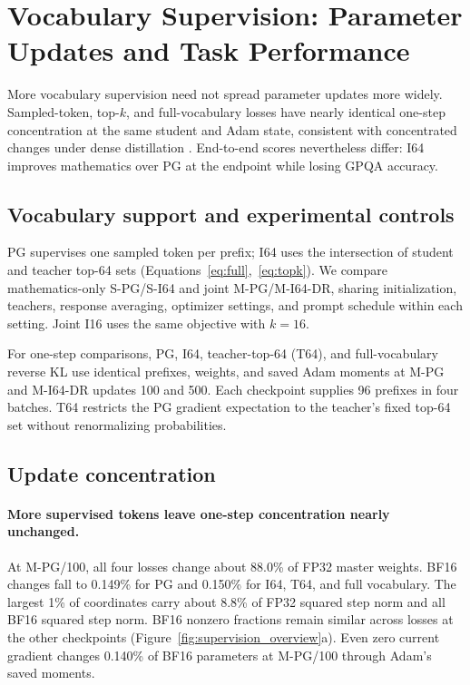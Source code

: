 \section{Vocabulary Supervision: Parameter Updates and Task Performance}
\label{sec:density}

More vocabulary supervision need not spread parameter updates more widely. Sampled-token, top-$k$, and full-vocabulary losses have nearly identical one-step concentration at the same student and Adam state, consistent with concentrated changes under dense distillation \citep{yu2026denseupdates}. End-to-end scores nevertheless differ: I64 improves mathematics over PG at the endpoint while losing GPQA accuracy.

\subsection{Vocabulary support and experimental controls}

PG supervises one sampled token per prefix; I64 uses the intersection of student and teacher top-64 sets (Equations~\ref{eq:full},~\ref{eq:topk}). We compare mathematics-only S-PG/S-I64 and joint M-PG/M-I64-DR, sharing initialization, teachers, response averaging, optimizer settings, and prompt schedule within each setting. Joint I16 uses the same objective with $k=16$.

For one-step comparisons, PG, I64, teacher-top-64 (T64), and full-vocabulary reverse KL use identical prefixes, weights, and saved Adam moments at M-PG and M-I64-DR updates 100 and 500. Each checkpoint supplies 96 prefixes in four batches. T64 restricts the PG gradient expectation to the teacher's fixed top-64 set without renormalizing probabilities.

\subsection{Update concentration}

\paragraph{More supervised tokens leave one-step concentration nearly unchanged.}
At M-PG/100, all four losses change about 88.0\% of FP32 master weights. BF16 changes fall to 0.149\% for PG and 0.150\% for I64, T64, and full vocabulary. The largest 1\% of coordinates carry about 8.8\% of FP32 squared step norm and all BF16 squared step norm. BF16 nonzero fractions remain similar across losses at the other checkpoints (Figure~\ref{fig:supervision_overview}a). Even zero current gradient changes 0.140\% of BF16 parameters at M-PG/100 through Adam's saved moments.

